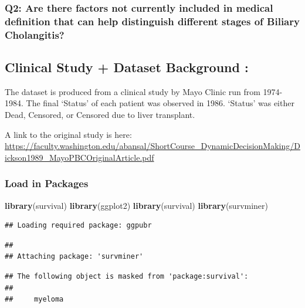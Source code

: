 \documentclass[
]{article}
\newenvironment{Shaded}{\begin{snugshade}}{\end{snugshade}}
\newcommand{\FunctionTok}[1]{\textcolor[rgb]{0.13,0.29,0.53}{\textbf{#1}}}
\newcommand{\NormalTok}[1]{#1}
\begin{document}
\hypertarget{q2-are-there-factors-not-currently-included-in-medical-definition-that-can-help-distinguish-different-stages-of-biliary-cholangitis}{%
\subsubsection{Q2: Are there factors not currently included in medical
definition that can help distinguish different stages of Biliary
Cholangitis?}\label{q2-are-there-factors-not-currently-included-in-medical-definition-that-can-help-distinguish-different-stages-of-biliary-cholangitis}}

\hypertarget{clinical-study-dataset-background}{%
\subsection{Clinical Study + Dataset Background
:}\label{clinical-study-dataset-background}}

The dataset is produced from a clinical study by Mayo Clinic run from
1974-1984. The final `Status' of each patient was observed in 1986.
`Status' was either Dead, Censored, or Censored due to liver transplant.

A link to the original study is here:
\url{https://faculty.washington.edu/abansal/ShortCourse_DynamicDecisionMaking/Dickson1989_MayoPBCOriginalArticle.pdf}

\hypertarget{load-in-packages}{%
\subsubsection{Load in Packages}\label{load-in-packages}}

\begin{Shaded}
\begin{Highlighting}[]
\FunctionTok{library}\NormalTok{(survival)}
\FunctionTok{library}\NormalTok{(ggplot2)}
\FunctionTok{library}\NormalTok{(survival)}
\FunctionTok{library}\NormalTok{(survminer)}
\end{Highlighting}
\end{Shaded}

\begin{verbatim}
## Loading required package: ggpubr
\end{verbatim}

\begin{verbatim}
## 
## Attaching package: 'survminer'
\end{verbatim}

\begin{verbatim}
## The following object is masked from 'package:survival':
## 
##     myeloma
\end{verbatim}
\end{document}
